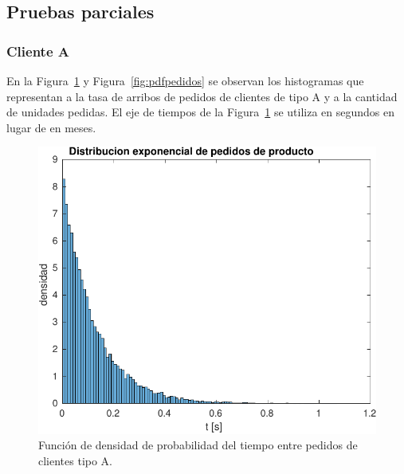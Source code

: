\documentclass[10pt]{article}
\begin{document}
\subsection{Pruebas parciales}


 
\subsubsection{Cliente A} 
 
En la Figura~\ref{fig:pdftiempo} y Figura~\ref{fig:pdfpedidos} se observan los histogramas que representan a la tasa de arribos de pedidos de clientes de tipo A y a la cantidad de unidades pedidas. El eje de tiempos de la Figura~\ref{fig:pdftiempo} se utiliza en segundos en lugar de en meses. 
 
\begin{figure} 
\centering 
\includegraphics[scale=0.8]{img/pdf_tiempo_pedidos} 
\caption{Función de densidad de probabilidad del tiempo entre pedidos de clientes tipo A.} 
\label{fig:pdftiempo} 
\end{figure} 
 
\end{document}
